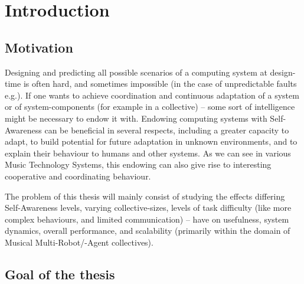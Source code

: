 \chapter{Introduction}
\label{chap:introduction}	


\section{Motivation}

Designing and predicting all possible scenarios of a computing system at design-time is often hard, and sometimes impossible (in the case of unpredictable faults e.g.). If one wants to achieve coordination and continuous adaptation of a system or of system-components (for example in a collective) -- some sort of intelligence might be necessary to endow it with. Endowing computing systems with Self-Awareness can be beneficial in several respects, including a greater capacity to adapt, to build potential for future adaptation in unknown environments, and to explain their behaviour to humans and other systems. As we can see in various Music Technology Systems, this endowing can also give rise to interesting cooperative and coordinating behaviour.

The problem of this thesis will mainly consist of studying the effects differing Self-Awareness levels, varying collective-sizes, levels of task difficulty (like more complex behaviours, and limited communication) -- have on usefulness, system dynamics, overall performance, and scalability (primarily within the domain of Musical Multi-Robot/-Agent collectives).




\section{Goal of the thesis} %





